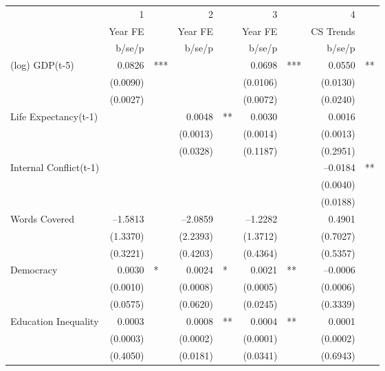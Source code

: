 \begin{tabular} {l* {4}{r @{} l}}
\hline
            &           1&   &           2&   &           3&   &           4&   \\
            &     Year FE&   &     Year FE&   &     Year FE&   &   CS Trends&   \\
            &      b/se/p&   &      b/se/p&   &      b/se/p&   &      b/se/p&   \\
\hline
(log) GDP(t-5)&      0.0826&***&            &   &      0.0698&***&      0.0550&** \\
            &    (0.0090)&   &            &   &    (0.0106)&   &    (0.0130)&   \\
            &    (0.0027)&   &            &   &    (0.0072)&   &    (0.0240)&   \\
Life Expectancy(t-1) &            &   &      0.0048&** &      0.0030&   &      0.0016&   \\
            &            &   &    (0.0013)&   &    (0.0014)&   &    (0.0013)&   \\
            &            &   &    (0.0328)&   &    (0.1187)&   &    (0.2951)&   \\
Internal Conflict(t-1)&            &   &            &   &            &   &    --0.0184&** \\
            &            &   &            &   &            &   &    (0.0040)&   \\
            &            &   &            &   &            &   &    (0.0188)&   \\
Words Covered&    --1.5813&   &    --2.0859&   &    --1.2282&   &      0.4901&   \\
            &    (1.3370)&   &    (2.2393)&   &    (1.3712)&   &    (0.7027)&   \\
            &    (0.3221)&   &    (0.4203)&   &    (0.4364)&   &    (0.5357)&   \\
Democracy   &      0.0030&*  &      0.0024&*  &      0.0021&** &    --0.0006&   \\
            &    (0.0010)&   &    (0.0008)&   &    (0.0005)&   &    (0.0006)&   \\
            &    (0.0575)&   &    (0.0620)&   &    (0.0245)&   &    (0.3339)&   \\
Education Inequality&      0.0003&   &      0.0008&** &      0.0004&** &      0.0001&   \\
            &    (0.0003)&   &    (0.0002)&   &    (0.0001)&   &    (0.0002)&   \\
            &    (0.4050)&   &    (0.0181)&   &    (0.0341)&   &    (0.6943)&   \\

\end{tabular}
